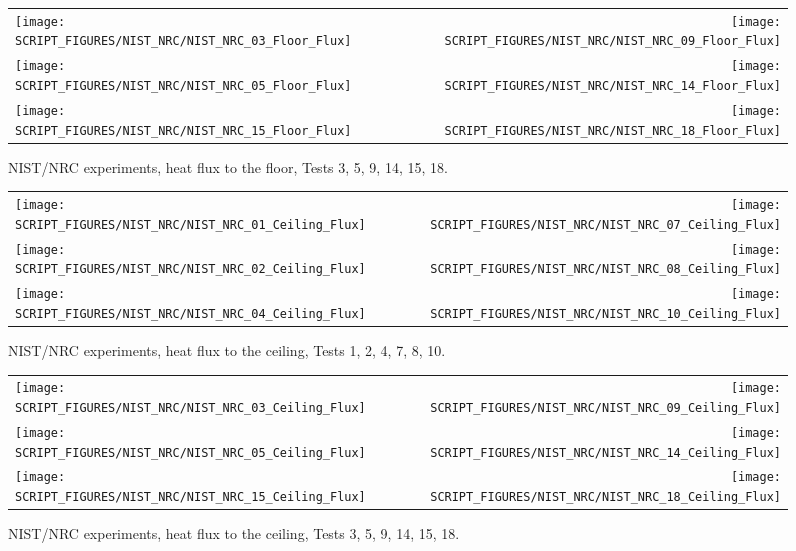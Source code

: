 \begin{figure}[p]
\begin{tabular*}{\textwidth}{l@{\extracolsep{\fill}}r}
\texttt{[image: SCRIPT\_FIGURES/NIST\_NRC/NIST\_NRC\_03\_Floor\_Flux]} &
\texttt{[image: SCRIPT\_FIGURES/NIST\_NRC/NIST\_NRC\_09\_Floor\_Flux]} \\
\texttt{[image: SCRIPT\_FIGURES/NIST\_NRC/NIST\_NRC\_05\_Floor\_Flux]} &
\texttt{[image: SCRIPT\_FIGURES/NIST\_NRC/NIST\_NRC\_14\_Floor\_Flux]} \\
\texttt{[image: SCRIPT\_FIGURES/NIST\_NRC/NIST\_NRC\_15\_Floor\_Flux]} &
\texttt{[image: SCRIPT\_FIGURES/NIST\_NRC/NIST\_NRC\_18\_Floor\_Flux]}
\end{tabular*}
\caption[NIST/NRC experiments, heat flux to the floor, Tests 3, 5, 9, 14, 15, 18]{NIST/NRC experiments, heat flux to the floor, Tests 3, 5, 9, 14, 15, 18.}
\label{NIST_NRC_Floor_Flux_Open}
\end{figure}


\begin{figure}[p]
\begin{tabular*}{\textwidth}{l@{\extracolsep{\fill}}r}
\texttt{[image: SCRIPT\_FIGURES/NIST\_NRC/NIST\_NRC\_01\_Ceiling\_Flux]} &
\texttt{[image: SCRIPT\_FIGURES/NIST\_NRC/NIST\_NRC\_07\_Ceiling\_Flux]} \\
\texttt{[image: SCRIPT\_FIGURES/NIST\_NRC/NIST\_NRC\_02\_Ceiling\_Flux]} &
\texttt{[image: SCRIPT\_FIGURES/NIST\_NRC/NIST\_NRC\_08\_Ceiling\_Flux]} \\
\texttt{[image: SCRIPT\_FIGURES/NIST\_NRC/NIST\_NRC\_04\_Ceiling\_Flux]} &
\texttt{[image: SCRIPT\_FIGURES/NIST\_NRC/NIST\_NRC\_10\_Ceiling\_Flux]}
\end{tabular*}
\caption[NIST/NRC experiments, heat flux to the ceiling, Tests 1, 2, 4, 7, 8, 10]{NIST/NRC experiments, heat flux to the ceiling, Tests 1, 2, 4, 7, 8, 10.}
\label{NIST_NRC_Ceiling_Flux_Closed}
\end{figure}

\begin{figure}[p]
\begin{tabular*}{\textwidth}{l@{\extracolsep{\fill}}r}
\texttt{[image: SCRIPT\_FIGURES/NIST\_NRC/NIST\_NRC\_03\_Ceiling\_Flux]} &
\texttt{[image: SCRIPT\_FIGURES/NIST\_NRC/NIST\_NRC\_09\_Ceiling\_Flux]} \\
\texttt{[image: SCRIPT\_FIGURES/NIST\_NRC/NIST\_NRC\_05\_Ceiling\_Flux]} &
\texttt{[image: SCRIPT\_FIGURES/NIST\_NRC/NIST\_NRC\_14\_Ceiling\_Flux]} \\
\texttt{[image: SCRIPT\_FIGURES/NIST\_NRC/NIST\_NRC\_15\_Ceiling\_Flux]} &
\texttt{[image: SCRIPT\_FIGURES/NIST\_NRC/NIST\_NRC\_18\_Ceiling\_Flux]}
\end{tabular*}
\caption[NIST/NRC experiments, heat flux to the ceiling, Tests 3, 5, 9, 14, 15, 18]{NIST/NRC experiments, heat flux to the ceiling, Tests 3, 5, 9, 14, 15, 18.}
\label{NIST_NRC_Ceiling_Flux_Open}
\end{figure}

